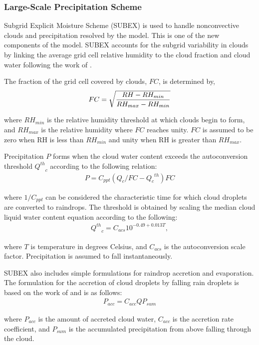 \subsubsection{Large-Scale Precipitation Scheme}  Subgrid Explicit Moisture
Scheme (SUBEX) is used to handle nonconvective clouds and precipitation resolved
by the model.  This is one of the new components of the model.  SUBEX accounts
for the subgrid variability in clouds by linking the average grid cell relative
humidity to the cloud fraction and cloud water following the work of
\cite{Sundqvist_89}.  

The fraction of the grid cell covered by clouds, $FC$, is determined by,
\begin{eqnarray} FC = \sqrt{ { {RH - RH_{min}} \over {RH_{max} - RH_{min} }} }
\end{eqnarray}

\noindent where ${RH_{min}}$ is the relative humidity threshold at which clouds
begin to form, and ${RH_{max}}$ is the relative humidity where $FC$ reaches
unity.  $FC$ is assumed to be zero when RH is less than ${RH_{min}}$ and unity
when RH is greater than ${RH_{max}}$.  

Precipitation $P$ forms when the cloud water content exceeds the autoconversion
threshold ${Q^{th}}_c$ according to the following relation: \begin{eqnarray} P =
C_{ppt}(Q_c/FC - {{Q_c}^{th}})FC \end{eqnarray}

\noindent where $1/C_{ppt}$ can be considered the characteristic time for which
cloud droplets are converted to raindrops.  The threshold is obtained by scaling
the median cloud liquid water content equation according to the following:
\begin{eqnarray} {Q^{th}}_c = C_{acs} 10^{-0.49 + 0.013T}, \end{eqnarray}

\noindent where $T$ is temperature in degrees Celsius, and $C_{acs}$ is the
autoconversion scale factor.  Precipitation is assumed to fall instantaneously.

SUBEX also includes simple formulations for raindrop accretion and evaporation.
The formulation for the accretion of cloud droplets by falling rain droplets is
based on the work of \cite{Beheng_94} and is as follows: \begin{eqnarray}
P_{acc} = C_{acc} Q P_{sum} \end{eqnarray}

\noindent where $P_{acc}$ is the amount of accreted cloud water, $C_{acc}$ is
the accretion rate coefficient, and $P_{sum}$ is the accumulated precipitation
from above falling through the cloud.  

